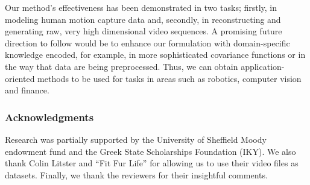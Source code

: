 \documentclass{article} %
\begin{document}

Our method's effectiveness has been demonstrated in two tasks;
firstly, in modeling human motion capture data and, secondly, in
reconstructing and generating raw, very high dimensional video
sequences. A promising future direction to follow would be to enhance
our formulation with domain-specific knowledge encoded, for example,
in more sophisticated covariance functions or in the way that data are
being preprocessed. Thus, we can obtain application-oriented methods
to be used for tasks in areas such as robotics, computer vision and
finance.


\subsubsection*{Acknowledgments}
Research was partially supported by the University of Sheffield Moody endowment fund and the Greek State Scholarships Foundation (IKY).
We also thank Colin Litster and ``Fit Fur Life'' for allowing us to use their video files as datasets. Finally, we thank the reviewers for their insightful comments.

%

\renewcommand*{\refname}{\begin{normalsize}References\end{normalsize}}

%
\end{document}
